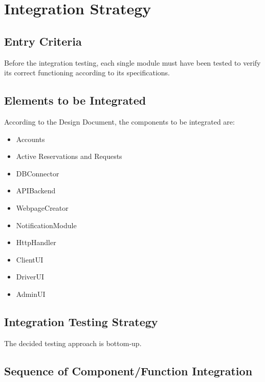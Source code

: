 \documentclass{article}
\begin{document}
\section{Integration Strategy}
\subsection{Entry Criteria}
Before the integration testing, each single module must have been tested to verify its correct functioning according to its specifications.
\subsection{Elements to be Integrated}
According to the Design Document, the components to be integrated are:
\begin{itemize}
	\item Accounts
	\item Active Reservations and Requests
	\item DBConnector
	\item APIBackend
	\item WebpageCreator
	\item NotificationModule
	\item HttpHandler
	\item ClientUI
	\item DriverUI
	\item AdminUI
\end{itemize}
\subsection{Integration Testing Strategy}
The decided testing approach is bottom-up. %
\subsection{Sequence of Component/Function Integration}
\end{document}
